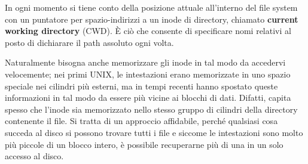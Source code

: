 \noindent In ogni momento si tiene conto della posizione attuale all'interno del file system con un puntatore per spazio-indirizzi a un inode di
directory, chiamato \textbf{current working directory} (CWD). È ciò che consente di specificare nomi relativi al posto di dichiarare il path assoluto
ogni volta.\par
Naturalmente bisogna anche memorizzare gli inode in tal modo da accedervi velocemente; nei primi UNIX, le intestazioni erano memorizzate in uno spazio
speciale nei cilindri più esterni, ma in tempi recenti hanno spostato queste informazioni in tal modo da essere più vicine ai blocchi di dati. Difatti,
capita spesso che l'inode sia memorizzato nello stesso gruppo di cilindri della directory contenente il file. Si tratta di un approccio affidabile,
perché qualsiasi cosa succeda al disco si possono trovare tutti i file e siccome le intestazioni sono molto più piccole di un blocco intero, è possibile
recuperarne più di una in un solo accesso al disco.

%

